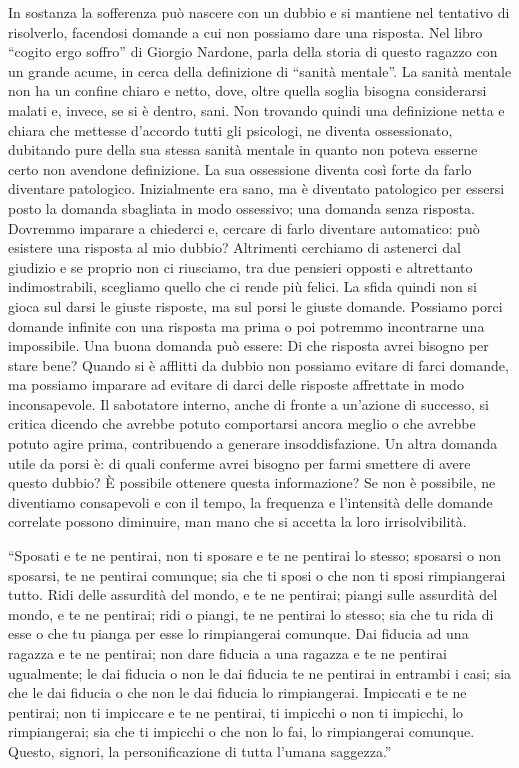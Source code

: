\documentclass[12pt]{book} %
\begin{document}
In sostanza la sofferenza può nascere con un dubbio e si mantiene nel tentativo di risolverlo, facendosi domande a cui non
possiamo dare una risposta. Nel libro “cogito ergo soffro” di Giorgio
Nardone, parla della storia di questo ragazzo con un grande acume, in cerca della definizione di “sanità mentale”. La
sanità mentale non ha un confine chiaro e netto, dove, oltre quella soglia bisogna considerarsi malati e, invece, se si
è dentro, sani. Non trovando quindi una definizione netta e chiara che mettesse d'accordo tutti
gli psicologi, ne diventa ossessionato, dubitando pure della sua stessa sanità mentale in quanto non poteva esserne
certo non avendone definizione. La sua ossessione diventa così forte da farlo diventare patologico. Inizialmente era
sano, ma è diventato patologico per essersi posto la domanda sbagliata in modo ossessivo; una domanda senza risposta. Dovremmo
imparare a chiederci e, cercare di farlo diventare automatico: può esistere una risposta al mio dubbio? Altrimenti cerchiamo di astenerci dal
giudizio e se proprio non ci riusciamo, tra due pensieri opposti e altrettanto indimostrabili, scegliamo quello che ci
rende più felici. La sfida quindi non si gioca sul darsi le giuste risposte, ma sul porsi le giuste domande. Possiamo porci domande infinite con una risposta ma prima o poi potremmo incontrarne una impossibile. Una
buona domanda può essere: Di che risposta avrei bisogno per stare bene? Quando si è afflitti da dubbio non
possiamo evitare di farci domande, ma possiamo imparare ad evitare di darci delle
risposte affrettate in modo inconsapevole. Il sabotatore interno, anche di fronte a un'azione di successo, si critica dicendo che
avrebbe potuto comportarsi ancora meglio o che avrebbe potuto agire prima, contribuendo a generare insoddisfazione. Un altra domanda utile da porsi è: di quali conferme avrei bisogno per farmi
smettere di avere questo dubbio? È possibile ottenere questa informazione? Se non è possibile, ne diventiamo consapevoli e con il tempo, la frequenza e l'intensità delle domande correlate possono diminuire, man mano che si accetta la loro irrisolvibilità.

“Sposati e te ne pentirai, non ti sposare e te ne pentirai lo stesso; sposarsi o non sposarsi, te ne pentirai comunque;
sia che ti sposi o che non ti sposi rimpiangerai tutto. Ridi delle assurdità del mondo, e te ne pentirai; piangi sulle
assurdità del mondo, e te ne pentirai; ridi o piangi, te ne pentirai lo stesso; sia che tu rida di esse o che tu pianga
per esse lo rimpiangerai comunque. Dai fiducia ad una ragazza e te ne pentirai; non dare fiducia a una ragazza e te ne
pentirai ugualmente; le dai fiducia o non le dai fiducia te ne pentirai in entrambi i casi; sia che le dai fiducia o
che non le dai fiducia lo rimpiangerai. Impiccati e te ne pentirai; non ti impiccare e te ne pentirai, ti impicchi o
non ti impicchi, lo rimpiangerai; sia che ti impicchi o che non lo fai, lo rimpiangerai comunque. Questo, signori, la
personificazione di tutta l'umana saggezza.”
\end{document}
